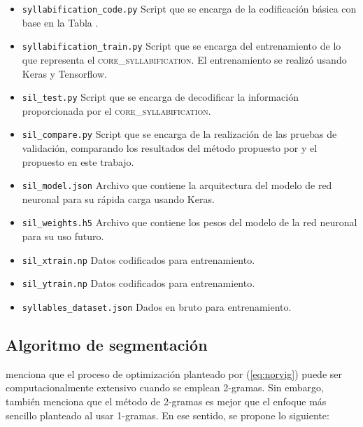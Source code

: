 \begin{itemize}
	\item \texttt{syllabification\_code.py} Script que se encarga de la codificación básica con base en la Tabla .
	\item \texttt{syllabification\_train.py} Script que se encarga del entrenamiento de lo que representa el \textsc{core\_syllabification}. El entrenamiento se realizó usando Keras y Tensorflow.
	\item \texttt{sil\_test.py} Script que se encarga de decodificar la información proporcionada por el \textsc{core\_syllabification}.
	\item \texttt{sil\_compare.py} Script que se encarga de la realización de las pruebas de validación, comparando los resultados del método propuesto por \cite{hernandez2013automatic} y el propuesto en este trabajo.
	\item \texttt{sil\_model.json} Archivo que contiene la arquitectura del modelo de red neuronal para su rápida carga usando Keras.
	\item \texttt{sil\_weights.h5} Archivo que contiene los pesos del modelo de la red neuronal para su uso futuro.
	\item \texttt{sil\_xtrain.np} Datos codificados para entrenamiento.
	\item \texttt{sil\_ytrain.np} Datos codificados para entrenamiento.
	\item \texttt{syllables\_dataset.json} Dados en bruto para entrenamiento.
\end{itemize}

\subsection{Algoritmo de segmentación}

\cite{cano2019segmentacion} menciona que el proceso de optimización planteado por (\ref{eq:norvig}) puede ser computacionalmente extensivo cuando se emplean 2-gramas. Sin embargo, también menciona que el método de 2-gramas es mejor que el enfoque más sencillo planteado al usar 1-gramas. En ese sentido, se propone lo siguiente:

